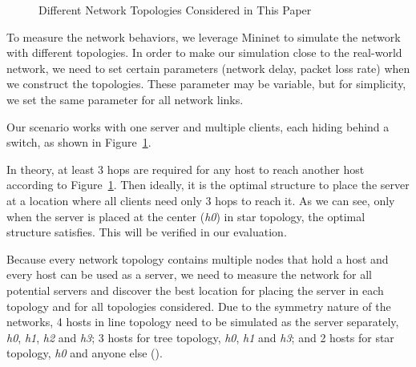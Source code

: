 \begin{figure}[ht]

\caption{Different Network Topologies Considered in This Paper} 
\label{fig:topo}
\end{figure}

To measure the network behaviors, we leverage Mininet \cite{Mininet:official}
to simulate the network with different topologies. In order to make our simulation
close to the real-world network, we need to set certain parameters (\eg network 
delay, packet loss rate) when we construct the topologies. These parameter may be
variable, but for simplicity, we set the same parameter for all network links. 

Our scenario works with one server and multiple clients, each hiding behind a 
switch, as shown in Figure~\ref{fig:topo}.

In theory, at least 3 hops are required for any host to reach another host according
to Figure~\ref{fig:topo}. Then ideally, it is the optimal structure to place the server 
at a location where all clients need only 3 hops to reach it. As we can see, only 
when the server is placed at the center ({\it h0}) in star topology, the optimal 
structure satisfies. This will be verified in our evaluation.

Because every network topology contains multiple nodes that hold a host and every 
host can be used as a server, we need to measure the network for all potential servers
and discover the best location for placing the server in each topology and for all
topologies considered. Due to the symmetry nature of the networks, 4 hosts in line topology
need to be simulated as the server separately, {\it h0}, {\it h1}, {\it h2} and 
{\it h3}; 3 hosts for tree topology, {\it h0}, {\it h1} and {\it h3}; and 
2 hosts for star topology, {\it h0} and anyone else (). 


